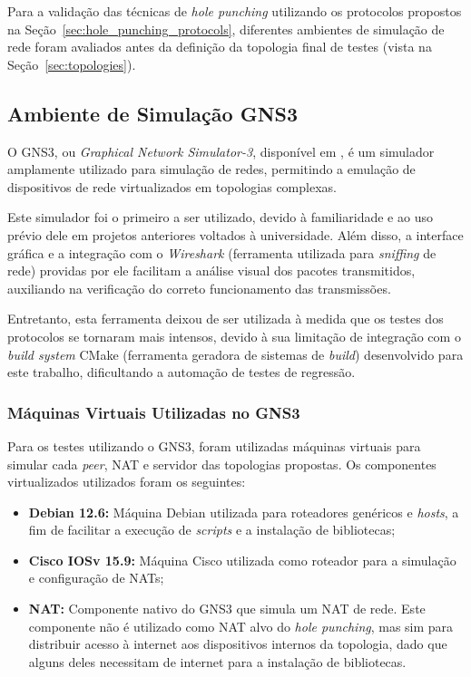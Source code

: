 Para a validação das técnicas de \textit{hole punching} utilizando os protocolos propostos na Seção~\ref{sec:hole_punching_protocols}, diferentes ambientes de simulação de rede foram avaliados antes da definição da topologia final de testes (vista na Seção~\ref{sec:topologies}).


\subsection{Ambiente de Simulação GNS3}

O GNS3, ou \textit{Graphical Network Simulator-3}, disponível em \citep{gns3}, é um simulador amplamente utilizado para simulação de redes, permitindo a emulação de dispositivos de rede virtualizados em topologias complexas.

Este simulador foi o primeiro a ser utilizado, devido à familiaridade e ao uso prévio dele em projetos anteriores voltados à universidade. Além disso, a interface gráfica e a integração com o \textit{Wireshark} (ferramenta utilizada para \textit{sniffing} de rede) providas por ele facilitam a análise visual dos pacotes transmitidos, auxiliando na verificação do correto funcionamento das transmissões.

Entretanto, esta ferramenta deixou de ser utilizada à medida que os testes dos protocolos se tornaram mais intensos, devido à sua limitação de integração com o \textit{build system} CMake (ferramenta geradora de sistemas de \textit{build}) desenvolvido para este trabalho, dificultando a automação de testes de regressão.

\subsubsection{Máquinas Virtuais Utilizadas no GNS3}

Para os testes utilizando o GNS3, foram utilizadas máquinas virtuais para simular cada \textit{peer}, NAT e servidor das topologias propostas. Os componentes virtualizados utilizados foram os seguintes:

\begin{itemize}
    \item \textbf{Debian 12.6:} Máquina Debian utilizada para roteadores genéricos e \textit{hosts}, a fim de facilitar a execução de \textit{scripts} e a instalação de bibliotecas;
    \item \textbf{Cisco IOSv 15.9:} Máquina Cisco utilizada como roteador para a simulação e configuração de NATs;
    \item \textbf{NAT:} Componente nativo do GNS3 que simula um NAT de rede. Este componente não é utilizado como NAT alvo do \textit{hole punching}, mas sim para distribuir acesso à internet aos dispositivos internos da topologia, dado que alguns deles necessitam de internet para a instalação de bibliotecas.
\end{itemize}


